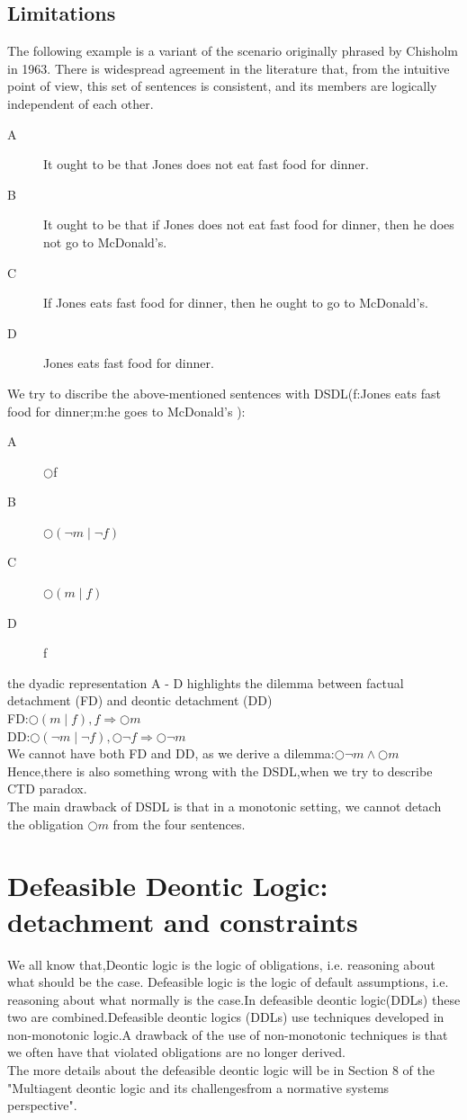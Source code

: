 \documentclass{article}
\begin{document}
\subsection{Limitations}
The following example is a variant of the scenario originally phrased by Chisholm in
1963. There is widespread agreement in the literature that, from the intuitive point
of view, this set of sentences is consistent, and its members are logically independent
of each other.
\begin{description}
\item[A]It ought to be that Jones does not eat fast food for dinner.
\item[B]It ought to be that if Jones does not eat fast food for dinner, then he does not go to McDonald’s.
\item[C] If Jones eats fast food for dinner, then he ought to go to McDonald’s.
\item[D]Jones eats fast food for dinner.
\end{description}
We try to discribe the above-mentioned sentences with DSDL(f:Jones eats fast food for dinner;m:he goes to McDonald’s ):
\begin{description}
\item[A]$\bigcirc$f
\item[B]$\bigcirc(\neg m \mid \neg f)$
\item[C]$\bigcirc(m\mid f)$
\item[D]f
\end{description}
the dyadic representation A - D highlights the dilemma between factual detachment (FD) and deontic detachment (DD)\\
FD:$\bigcirc(m\mid f),f \Rightarrow \bigcirc m$\\
DD:$\bigcirc(\neg m \mid \neg f), \bigcirc\neg f \Rightarrow \bigcirc\neg m$\\
We cannot have both FD and DD, as we derive a dilemma:$\bigcirc\neg m\wedge\bigcirc m$\\
Hence,there is also something wrong with the DSDL,when we try to describe CTD paradox.\\
The main drawback of DSDL is that in a monotonic setting, we cannot detach
the obligation $\bigcirc m$ from the four sentences.
\section{Defeasible Deontic Logic: detachment and constraints}
We all know that,Deontic logic is the logic of obligations, i.e. reasoning about what should be the case. Defeasible logic is the logic of default assumptions, i.e. reasoning about what normally is the case.In defeasible deontic logic(DDLs) these two are combined.Defeasible deontic logics (DDLs) use techniques developed in non-monotonic logic.A drawback of the use of non-monotonic techniques is that we often have that
violated obligations are no longer derived.\\
The more details about the defeasible deontic logic will be in Section 8 of the "Multiagent deontic logic and its challengesfrom a normative systems perspective".
\end{document}
